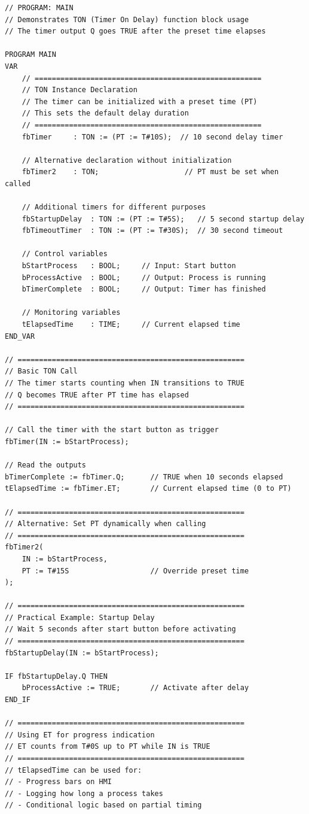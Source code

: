 \documentclass[11pt,a4paper]{article}
\begin{document}
\begin{lstlisting}
// PROGRAM: MAIN
// Demonstrates TON (Timer On Delay) function block usage
// The timer output Q goes TRUE after the preset time elapses

PROGRAM MAIN
VAR
    // =====================================================
    // TON Instance Declaration
    // The timer can be initialized with a preset time (PT)
    // This sets the default delay duration
    // =====================================================
    fbTimer     : TON := (PT := T#10S);  // 10 second delay timer
    
    // Alternative declaration without initialization
    fbTimer2    : TON;                    // PT must be set when called
    
    // Additional timers for different purposes
    fbStartupDelay  : TON := (PT := T#5S);   // 5 second startup delay
    fbTimeoutTimer  : TON := (PT := T#30S);  // 30 second timeout
    
    // Control variables
    bStartProcess   : BOOL;     // Input: Start button
    bProcessActive  : BOOL;     // Output: Process is running
    bTimerComplete  : BOOL;     // Output: Timer has finished
    
    // Monitoring variables
    tElapsedTime    : TIME;     // Current elapsed time
END_VAR

// =====================================================
// Basic TON Call
// The timer starts counting when IN transitions to TRUE
// Q becomes TRUE after PT time has elapsed
// =====================================================

// Call the timer with the start button as trigger
fbTimer(IN := bStartProcess);

// Read the outputs
bTimerComplete := fbTimer.Q;      // TRUE when 10 seconds elapsed
tElapsedTime := fbTimer.ET;       // Current elapsed time (0 to PT)

// =====================================================
// Alternative: Set PT dynamically when calling
// =====================================================
fbTimer2(
    IN := bStartProcess,
    PT := T#15S                   // Override preset time
);

// =====================================================
// Practical Example: Startup Delay
// Wait 5 seconds after start button before activating
// =====================================================
fbStartupDelay(IN := bStartProcess);

IF fbStartupDelay.Q THEN
    bProcessActive := TRUE;       // Activate after delay
END_IF

// =====================================================
// Using ET for progress indication
// ET counts from T#0S up to PT while IN is TRUE
// =====================================================
// tElapsedTime can be used for:
// - Progress bars on HMI
// - Logging how long a process takes
// - Conditional logic based on partial timing
\end{lstlisting}
\end{document}
